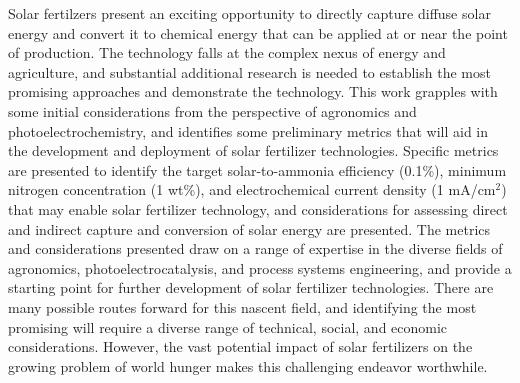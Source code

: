 Solar fertilzers present an exciting opportunity to directly capture diffuse solar energy and convert it to chemical energy that can be applied at or near the point of production. The technology falls at the complex nexus of energy and agriculture, and substantial additional research is needed to establish the most promising approaches and demonstrate the technology. This work grapples with some initial considerations from the perspective of agronomics and photoelectrochemistry, and identifies some preliminary metrics that will aid in the development and deployment of solar fertilizer technologies. Specific metrics are presented to identify the target solar-to-ammonia efficiency (0.1\%), minimum nitrogen concentration (1 wt\%), and electrochemical current density (1 mA/cm$^2$) that may enable solar fertilizer technology, and considerations for assessing direct and indirect capture and conversion of solar energy are presented. The metrics and considerations presented draw on a range of expertise in the diverse fields of agronomics, photoelectrocatalysis, and process systems engineering, and provide a starting point for further development of solar fertilizer technologies. There are many possible routes forward for this nascent field, and identifying the most promising will require a diverse range of technical, social, and economic considerations. However, the vast potential impact of solar fertilizers on the growing problem of world hunger makes this challenging endeavor worthwhile.


